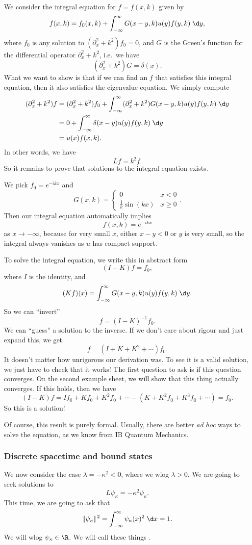 \documentclass[a4paper]{article}
\begin{document}
We consider the integral equation for $f = f(x, k)$ given by
\[
  f(x, k) = f_0(x, k) + \int_{-\infty}^\infty G(x - y, k) u(y) f(y, k) \;\d y,
\]
where $f_0$ is any solution to $(\partial^2_x + k^2) f_0 = 0$, and $G$ is the Green's function for the differential operator $\partial^2_x + k^2$, i.e.\ we have
\[
  (\partial_x^2 + k^2) G = \delta(x).
\]
What we want to show is that if we can find an $f$ that satisfies this integral equation, then it also satisfies the eigenvalue equation. We simply compute
\begin{align*}
  (\partial_x^2 + k^2) f &= (\partial_x^2 + k^2)f_0 + \int_{-\infty}^\infty (\partial_x^2 + k^2) G(x - y, k) u(y) f(y, k) \;\d y\\\
  &= 0 + \int_{-\infty}^\infty \delta(x - y) u(y) f(y, k)\;\d y\\
  &= u(x) f(x, k).
\end{align*}
In other words, we have
\[
  Lf = k^2 f.
\]
So it remains to prove that solutions to the integral equation exists.

We pick $f_0 = e^{-ikx}$ and
\[
  G(x, k) =
  \begin{cases}
    0 & x < 0\\
    \frac{1}{k} \sin (kx) & x \geq 0
  \end{cases}.
\]
Then our integral equation automatically implies
\[
  f(x, k) = e^{-ikx}
\]
as $x \to -\infty$, because for very small $x$, either $x - y < 0$ or $y$ is very small, so the integral always vanishes as $u$ has compact support.

To solve the integral equation, we write this in abstract form
\[
  (I - K) f = f_0,
\]
where $I$ is the identity, and
\[
  (Kf)(x) = \int_{-\infty}^\infty G(x - y, k) u(y) f(y, k) \;\d y.
\]
So we can ``invert''
\[
  f = (I - K)^{-1} f_0.
\]
We can ``guess'' a solution to the inverse. If we don't care about rigour and just expand this, we get
\[
  f = (I + K + K^2 + \cdots)f_0.
\]
It doesn't matter how unrigorous our derivation was. To see it is a valid solution, we just have to check that it works! The first question to ask is if this question converges. On the second example sheet, we will show that this thing actually converges. If this holds, then we have
\[
  (I - K)f = If_0 + K f_0 + K^2 f_0 + \cdots - (K + K^2 f_0 + K^3 f_0 + \cdots) = f_0.
\]
So this is a solution!

Of course, this result is purely formal. Usually, there are better \emph{ad hoc} ways to solve the equation, as we know from IB Quantum Mechanics.

\subsubsection{Discrete spacetime and bound states}
We now consider the case $\lambda = - \kappa^2 < 0$, where we wlog $\lambda > 0$. We are going to seek solutions to
\[
  L \psi_\kappa = - \kappa^2 \psi_\kappa.
\]
This time, we are going to ask that
\[
  \|\psi_\kappa\|^2 = \int_{-\infty}^\infty \psi_\kappa(x)^2 \;\d x = 1.
\]
We will wlog $\psi_\kappa \in \R$. We will call these things .
\end{document}
